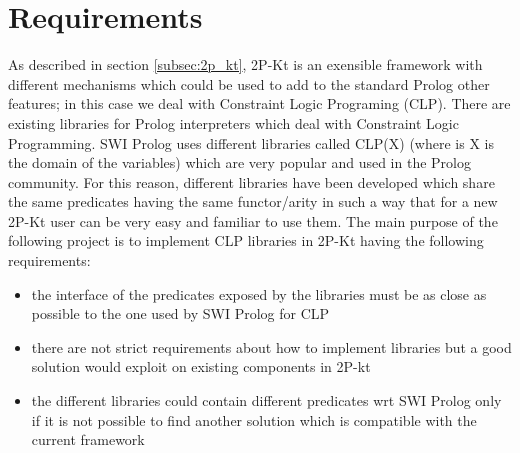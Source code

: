 \section{Requirements}\label{sec:Requirements}

As described in section \ref{subsec:2p_kt}, 2P-Kt is an exensible framework with different mechanisms
which could be used to add to the standard Prolog other features; in this case we deal with Constraint Logic Programing (CLP).\newline
There are existing libraries for Prolog interpreters which deal with Constraint Logic Programming. SWI Prolog uses different libraries
called CLP(X) (where is X is the domain of the variables) which are very popular and used in the Prolog community. For this reason, different libraries
have been developed which share the same predicates having the same functor/arity in such a way that for a new 2P-Kt user can be very easy and familiar to use them.\newline
The main purpose of the following project is to implement CLP libraries in 2P-Kt having the following requirements:
\begin{itemize}
    \item the interface of the predicates exposed by the libraries must be as close as possible to the one used by SWI Prolog for CLP
    \item there are not strict requirements about how to implement libraries but a good solution would exploit on existing components in 2P-kt
    \item the different libraries could contain different predicates wrt SWI Prolog only if it is not possible to find another solution which is compatible with the current framework
\end{itemize}

